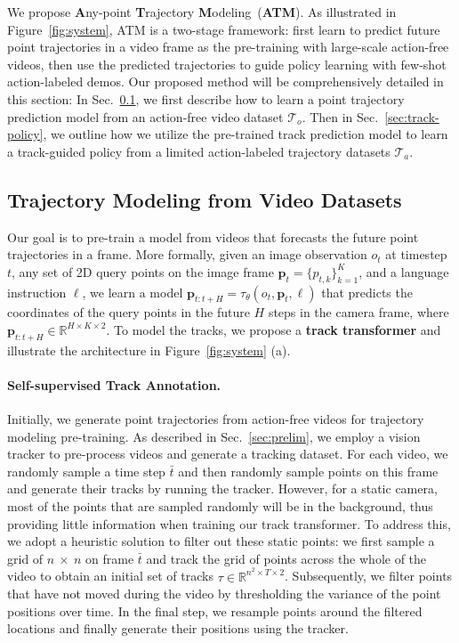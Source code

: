 We propose \textbf{A}ny-point \textbf{T}rajectory \textbf{M}odeling~(\textbf{ATM}). As illustrated in Figure~\ref{fig:system}, 
ATM is a two-stage framework: first learn to predict future point trajectories in a video frame as the pre-training with large-scale action-free videos, then use the predicted trajectories to guide policy learning with few-shot action-labeled demos. 
Our proposed method will be comprehensively detailed in this section: In Sec.~\ref{sec:track-model}, we first describe how to learn a point trajectory prediction model from an action-free video dataset $\mathcal{T}_{o}$. Then in Sec.~\ref{sec:track-policy}, we outline how we utilize the pre-trained track prediction model to learn a track-guided policy from a limited action-labeled trajectory datasets $\mathcal{T}_a$.

\subsection{Trajectory Modeling from Video Datasets} \label{sec:track-model}
Our goal is to pre-train a model from videos that forecasts the future point trajectories in a frame. More formally, given an image observation $o_t$ at timestep $t$, any set of 2D query points on the image frame $\mathbf{p}_t = \{p_{t, k}\}_{k=1}^K$, and a language instruction $\ell$, we learn a model $\mathbf{p}_{t:t+H} = \tau_\theta(o_t, \mathbf{p}_t, \ell)$ that predicts the coordinates of the query points in the future $H$ steps in the camera frame, where  $\mathbf{p}_{t:t+H} \in \mathbb{R}^{H \times K \times 2}$. To model the tracks, we propose a \textbf{track transformer} and illustrate the architecture in Figure~\ref{fig:system} (a).

\paragraph{Self-supervised Track Annotation.} \label{sec:TAP-annotation}
Initially, we generate point trajectories from action-free videos for trajectory modeling pre-training.
As described in Sec.~\ref{sec:prelim}, we employ a vision tracker to pre-process videos and generate a tracking dataset. For each video, we randomly sample a time step $\bar{t}$ and then randomly sample points on this frame and generate their tracks by running the tracker. However, for a static camera, most of the points that are sampled randomly will be in the background, thus providing little information when training our track transformer. To address this, we adopt a heuristic solution to filter out these static points: we first sample a grid of $n~\times~n$ on frame $\bar{t}$ and track the grid of points across the whole of the video to obtain an initial set of tracks $\tau \in \mathbb{R}^{n^2 \times T \times 2}$. Subsequently, we filter points that have not moved during the video by thresholding the variance of the point positions over time. In the final step, we resample points around the filtered locations and finally generate their positions using the tracker.

